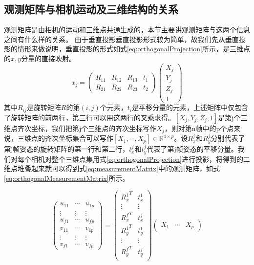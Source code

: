 \subsection{观测矩阵与相机运动及三维结构的关系}\label{subsec:measurementMatrix}
观测矩阵是由相机的运动和三维点共通生成的，本节主要讲观测矩阵与这两个信息之间有什么样的关系。
由于垂直投影垂直投影形式较为简单，故我们先从垂直投影的情形来做说明，垂直投影的形式如式\eqref{eq:orthogonalProjection}所示，是三维点的$x,y$分量的直接映射。
\begin{equation}\label{eq:affineCameraModel}
x_j=
\begin{pmatrix}
R_{11} & R_{12} & R_{13} & t_1\\
R_{21} & R_{22} & R_{23} & t_2
\end{pmatrix}
\begin{pmatrix}
X_j\\Y_j\\Z_j\\1
\end{pmatrix}
\end{equation}
其中$R_{ij}$是旋转矩阵$R$的第$(i,j)$个元素，$t_i$是平移分量的元素，上述矩阵中仅包含了旋转矩阵的前两行，第三行可以用这两行的叉乘求得。$[X_j,Y_j,Z_j,1]$是第j个三维点齐次坐标，我们把第j个三维点的齐次坐标写作$X_j$，则对第n帧中的p个点来说，三维点的齐次坐标集合可以写作$[X_1,\cdots,X_p]\in \mathbb{R}^{4\times p}$。设$R_x^j$和$R_y^j$分别代表了第j帧姿态的旋转矩阵的第一行和第二行，$t_x^j$和$t_y^j$代表了第j帧姿态的平移分量。我们对每个相机对整个三维点集用式\eqref{eq:orthogonalProjection}进行投影，将得到的二维点堆叠起来就可以得到式\eqref{eq:measurementMatrix}中的观测矩阵，如式\eqref{eq:orthogonalMeasurementMatrix}所示。

\begin{equation}\label{eq:measurementMatrix}
\begin{pmatrix}
u_{11}& \cdots & u_{1p}\\
\vdots& \vdots &\vdots\\
u_{f1}& \cdots & u_{fp}\\
v_{11}& \cdots & v_{1p}\\
\vdots& \vdots &\vdots\\
v_{f1}& \cdots & v_{fp}
\end{pmatrix}
=
\begin{pmatrix}
{R_x^1}^T & t_x^1\\
\vdots & \vdots\\
{R_x^f}^T & t_x^f\\
{R_y^1}^T & t_y^1\\
\vdots & \vdots\\
{R_y^f}^T & t_y^f\\
\end{pmatrix}
\begin{pmatrix}
X_1&\cdots &X_p
\end{pmatrix}
\end{equation}


